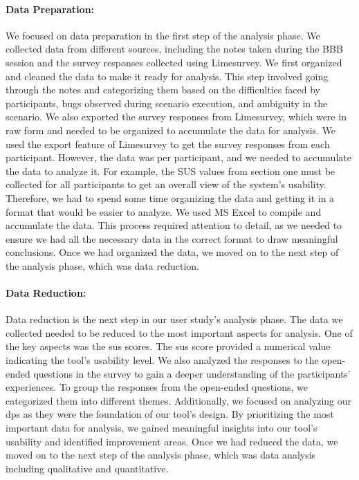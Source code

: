 \paragraph{Data Preparation:}
We focused on data preparation in the first step of the analysis phase. 
We collected data from different sources, including the notes taken during the BBB session and the survey responses collected using Limesurvey. 
We first organized and cleaned the data to make it ready for analysis. 
This step involved going through the notes and categorizing them based on the difficulties faced by participants, bugs observed during scenario execution, and ambiguity in the scenario. 
We also exported the survey responses from Limesurvey, which were in raw form and needed to be organized to accumulate the data for analysis.
We used the export feature of Limesurvey to get the survey responses from each participant. 
However, the data was per participant, and we needed to accumulate the data to analyze it. 
For example, the SUS values from section one must be collected for all participants to get an overall view of the system's usability. 
Therefore, we had to spend some time organizing the data and getting it in a format that would be easier to analyze. 
We used MS Excel to compile and accumulate the data. 
This process required attention to detail, as we needed to ensure we had all the necessary data in the correct format to draw meaningful conclusions. 
Once we had organized the data, we moved on to the next step of the analysis phase, which was data reduction.

\paragraph{Data Reduction:}
Data reduction is the next step in our user study's analysis phase. 
The data we collected needed to be reduced to the most important aspects for analysis. 
One of the key aspects was the \ac{sus} scores. 
The \ac{sus} score provided a numerical value indicating the tool's usability level. 
We also analyzed the responses to the open-ended questions in the survey to gain a deeper understanding of the participants' experiences. To group the responses from the open-ended questions, we categorized them into different themes. 
Additionally, we focused on analyzing our \ac{dp}s as they were the foundation of our tool's design. 
By prioritizing the most important data for analysis, we gained meaningful insights into our tool's usability and identified improvement areas.
Once we had reduced the data, we moved on to the next step of the analysis phase, which was data analysis including qualitative and quantitative.

